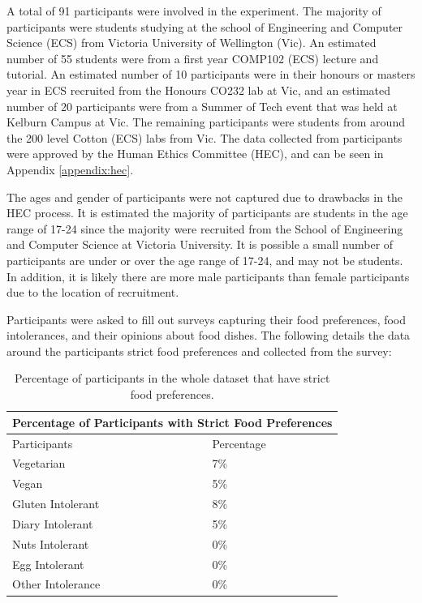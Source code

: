 A total of 91 participants were involved in the experiment. The majority of participants were students studying at the school of Engineering and Computer Science (ECS) from Victoria University of Wellington (Vic). An estimated number of 55 students were from a first year COMP102 (ECS) lecture and tutorial. An estimated number of 10 participants were in their honours or masters year in ECS recruited from the Honours CO232 lab at Vic, and an estimated number of 20 participants were from a Summer of Tech event that was held at Kelburn Campus at Vic. The remaining participants were students from around the 200 level Cotton (ECS) labs from Vic. The data collected from participants were approved by the Human Ethics Committee (HEC), and can be seen in Appendix  \ref{appendix:hec}.

The ages and gender of participants were not captured due to drawbacks in the HEC process. It is estimated the majority of participants are students in the age range of 17-24 since the majority were recruited from the School of Engineering and Computer Science at Victoria University. It is possible a small number of participants are under or over the age range of 17-24, and may not be students. In addition, it is likely there are more male participants than female participants due to the location of recruitment.

Participants were asked to fill out surveys capturing their food preferences, food intolerances, and their opinions about food dishes. The following details the data around the participants strict food preferences and collected from the survey:

\begin{table}[h!]
\centering
\begin{tabular}{|l|l|} 
 \hline
 \multicolumn{2}{|c|}{Percentage of Participants with Strict Food Preferences} \\
    \hline
    \hline
    Participants & Percentage \\
     \hline\hline
     Vegetarian & 7\%\\ [0.5ex] 
     \hline
     Vegan & 5\% \\
     \hline
     Gluten Intolerant & 8\% \\
    \hline
     Diary Intolerant & 5\% \\
     \hline
     Nuts Intolerant & 0\% \\
     \hline
     Egg Intolerant & 0\% \\
     \hline
     Other Intolerance & 0\% \\
     \hline
\end{tabular}
\caption{Percentage of participants in the whole dataset that have strict food preferences.}
\label{table:food_participants}
\end{table}

